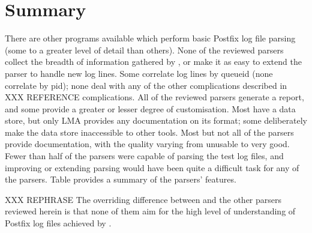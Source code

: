 \section{Summary}

There are other programs available which perform basic Postfix log file
parsing (some to a greater level of detail than others).   None of the
reviewed parsers collect the breadth of information gathered by
\parsername{}, or make it as easy to extend the parser to handle new log
lines.  Some correlate log lines by queueid (none correlate by pid); none
deal with any of the other complications described in XXX REFERENCE
complications.  All of the reviewed parsers generate a report, and some
provide a greater or lesser degree of customisation.  Most have a data
store, but only \gls{LMA} provides any documentation on its format; some
deliberately make the data store inaccessible to other tools.  Most but not
all of the parsers provide documentation, with the quality varying from
unusable to very good.  Fewer than half of the parsers were capable of
parsing the \numberOFlogFILES{} test log files, and improving or extending
parsing would have been quite a difficult task for any of the parsers.
Table  provides a summary of the
parsers' features.

XXX REPHRASE The overriding difference between \parsername{} and the other
parsers reviewed herein is that none of them aim for the high level of
understanding of Postfix log files achieved by \parsername{}.


